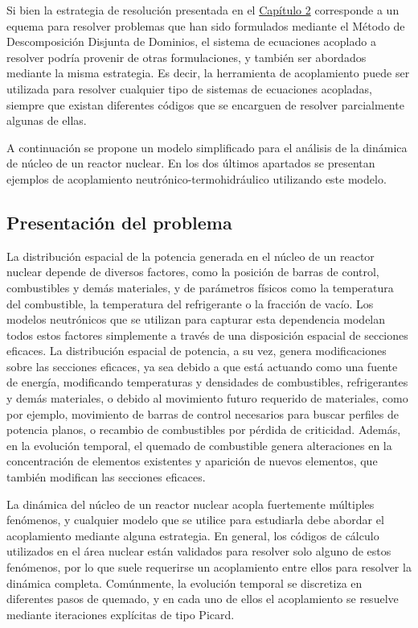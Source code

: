 Si bien la estrategia de resolución presentada en el \hyperlink{chapter.2}{Capítulo 2}
corresponde a un equema para resolver problemas que han sido formulados mediante el Método de Descomposición Disjunta de Dominios,
el sistema de ecuaciones acoplado a resolver podría provenir de otras formulaciones,
y también ser abordados mediante la misma estrategia.
Es decir, la herramienta de acoplamiento puede ser utilizada para resolver cualquier tipo de sistemas de ecuaciones acopladas,
siempre que existan diferentes códigos que se encarguen de resolver parcialmente algunas de ellas.

A continuación se propone un modelo simplificado para el análisis de la dinámica de núcleo de un reactor nuclear.
En los dos últimos apartados se presentan ejemplos de acoplamiento neutrónico-termohidráulico utilizando este modelo.

\subsection*{Presentación del problema}
\label{3:neut-th}

La distribución espacial de la potencia generada en el núcleo de un reactor nuclear
depende de diversos factores, como la posición de barras de control, combustibles y demás materiales,
y de parámetros físicos como la temperatura del combustible, la temperatura del refrigerante o la fracción de vacío.
Los modelos neutrónicos que se utilizan para capturar esta dependencia modelan todos estos factores simplemente a través de una disposición espacial de secciones eficaces.
La distribución espacial de potencia, a su vez, genera modificaciones sobre las secciones eficaces,
ya sea debido a que está actuando como una fuente de energía, modificando temperaturas y densidades de combustibles, refrigerantes y demás materiales,
o debido al movimiento futuro requerido de materiales,
como por ejemplo, movimiento de barras de control necesarios para buscar perfiles de potencia planos, o recambio de combustibles por pérdida de criticidad.
Además, en la evolución temporal, el quemado de combustible genera alteraciones en la concentración de elementos existentes y aparición de nuevos elementos,
que también modifican las secciones eficaces.

La dinámica del núcleo de un reactor nuclear acopla fuertemente múltiples fenómenos, y cualquier modelo que se utilice para estudiarla debe abordar el acoplamiento mediante alguna estrategia.
En general, los códigos de cálculo utilizados en el área nuclear están validados para resolver solo alguno de estos fenómenos,
por lo que suele requerirse un acoplamiento entre ellos para resolver la dinámica completa.
Comúnmente, la evolución temporal se discretiza en diferentes pasos de quemado, y en cada uno de ellos el acoplamiento se resuelve mediante iteraciones explícitas de tipo Picard.

